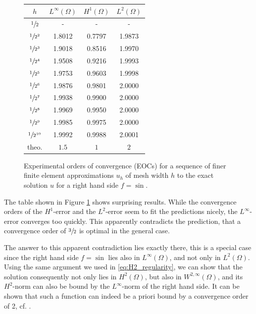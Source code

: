 \documentclass[headsepline,footsepline,footinclude=false,oneside,fontsize=11pt,paper=a4,listof=totoc,bibliography=totoc]{scrbook} %
\begin{document}
\begin{figure}[h!] 
	\centering
	\bgroup
	\def\arraystretch{1.3}
	\begin{tabular}{cccc}
		\hline
		$h$ & $L^\infty(\Omega)$ & $H^1(\Omega)$ & $L^2(\Omega)$ \\
		\hline
		$\sfrac{1}{2}$      	&	-	&	-	&	- \\
		$\sfrac{1}{2^2}$	&	\num{1.8012}	&	\num{0.7797}	&	\num{1.9873} \\
		$\sfrac{1}{2^3}$	&	\num{1.9018}	&	\num{0.8516}	&	\num{1.9970} \\
		$\sfrac{1}{2^4}$	&	\num{1.9508}	&	\num{0.9216}	&	\num{1.9993} \\
		$\sfrac{1}{2^5}$	&	\num{1.9753}	&	\num{0.9603}	&	\num{1.9998} \\
		$\sfrac{1}{2^6}$	&	\num{1.9876}	&	\num{0.9801}	&	\num{2.0000} \\
		$\sfrac{1}{2^7}$	&	\num{1.9938}	&	\num{0.9900}	&	\num{2.0000} \\
		$\sfrac{1}{2^8}$	&	\num{1.9969}	&	\num{0.9950}	&	\num{2.0000} \\
		$\sfrac{1}{2^9}$	&	\num{1.9985}	&	\num{0.9975}	&	\num{2.0000} \\
		$\sfrac{1}{2^{10}}$	&	\num{1.9992}	&	\num{0.9988}	&	\num{2.0001} \\
		\hline				
		theo. & $1.5$ & $1$ & $2$
	\end{tabular}
	\egroup
	\caption[EOCs for  $f = \sin$]{Experimental orders of convergence (EOCs) for a sequence of finer finite element approximations $u_h$ of mesh width $h$ to the exact solution $u$ for a right hand side $f = \sin$.}
	\label{fig:eocs_sin}
\end{figure}

The table shown in Figure \ref{fig:eocs_sin} shows surprising results. While the convergence orders of the $H^1$-error and the $L^2$-error seem to fit the predictions nicely, the $L^\infty$-error converges too quickly. This apparently contradicts the prediction, that a convergence order of $\sfrac{3}{2}$ is optimal in the general case. 

The answer to this apparent contradiction lies exactly there, this is a special case since the right hand side $f = \sin$ lies also in $L^\infty(\Omega)$, and not only in $L^2(\Omega)$. Using the same argument we used in \eqref{eq:H2_regularity}, we can show that the solution consequently not only lies in $H^2(\Omega)$, but also in $W^{2,\infty}(\Omega)$, and its $H^2$-norm can also be bound by the $L^\infty$-norm of the right hand side. It can be shown that such a function can indeed be a priori bound by a convergence order of 2, cf. \cite{brenner2002mathematical}.
\end{document}
